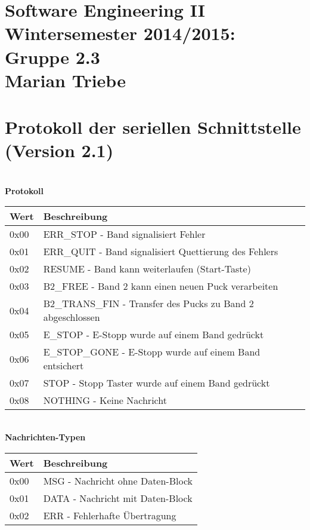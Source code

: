 \documentclass[a4paper,10pt]{article}
\begin{document}
  \section*{\small{Software Engineering II \\ Wintersemester 2014/2015: Gruppe 2.3 \\ Marian Triebe}}
  \section*{Protokoll der seriellen Schnittstelle (Version 2.1)}
  \textbf{\\ {\large Protokoll}}\\
  \newline
  \begin{tabular}{|l|l|}
    \hline
    \rowcolor{lightgray}\textbf{Wert} & \textbf{Beschreibung}\\
    \hline
    0x00 & ERR\_STOP - Band signalisiert Fehler\\
    \hline
    0x01 & ERR\_QUIT - Band signalisiert Quettierung des Fehlers\\
    \hline
    0x02 & RESUME - Band kann weiterlaufen (Start-Taste)\\
    \hline
    0x03 & B2\_FREE - Band 2 kann einen neuen Puck verarbeiten\\
    \hline
    0x04 & B2\_TRANS\_FIN - Transfer des Pucks zu Band 2 abgeschlossen\\
    \hline
    0x05 & E\_STOP - E-Stopp wurde auf einem Band gedrückt\\
    \hline
    0x06 & E\_STOP\_GONE - E-Stopp wurde auf einem Band entsichert\\
    \hline
    0x07 & STOP - Stopp Taster wurde auf einem Band gedrückt\\
    \hline
    0x08 & NOTHING - Keine Nachricht\\
    \hline
  \end{tabular}
  \newline \newline
  
  \textbf{\\ {\large Nachrichten-Typen}}\\
  \newline
  \begin{tabular}{|l|l|}
    \hline
    \rowcolor{lightgray}\textbf{Wert} & \textbf{Beschreibung}\\
    \hline
    0x00 & MSG - Nachricht ohne Daten-Block\\
    \hline
    0x01 & DATA - Nachricht mit Daten-Block\\
    \hline
    0x02 & ERR - Fehlerhafte Übertragung\\
    \hline
  \end{tabular}
  \newline \newline
 
\end{document}

